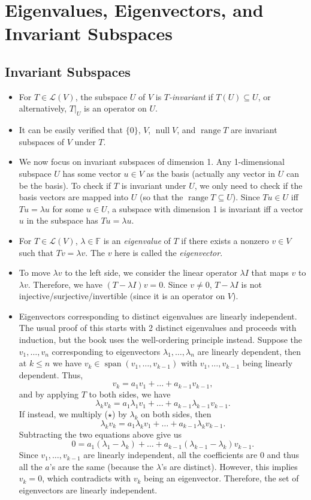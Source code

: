 \documentclass{article}
\newcommand{\F}{\mathbb{F}}
\newcommand{\s}{\operatorname{span}}
\newcommand{\n}{\operatorname{null}}
\renewcommand{\r}{\operatorname{range}}
\newcommand{\LV}{\mathcal{L}(V)}
\newcommand{\bv}{v_1,\dots,v_n}
\begin{document}
\section{Eigenvalues, Eigenvectors, and Invariant Subspaces}
\subsection{Invariant Subspaces}
\begin{itemize}
    \item For $T \in \LV$, the subspace $U$ of $V$ is \textit{$T$-invariant} if $T(U) \subseteq U$, or alternatively, $T|_U$ is an operator on $U$.
    \item It can be easily verified that $\{0\}$, $V$, $\n V$, and $\r T$ are invariant subspaces of $V$ under $T$.
    \item We now focus on invariant subspaces of dimension 1. Any 1-dimensional subspace $U$ has some vector $u \in V$ as the basis (actually any vector in $U$ can be the basis). To check if $T$ is invariant under $U$, we only need to check if the basis vectors are mapped into $U$ (so that the $\r T \subseteq U$). Since $Tu \in U$ iff $Tu = \lambda u$ for some $u \in U$, a subspace with dimension 1 is invariant iff a vector $u$ in the subspace has $Tu = \lambda u$.
    \item For $T \in \LV$, $\lambda \in \F$ is an \textit{eigenvalue} of $T$ if there exists a nonzero $v \in V$ such that $Tv = \lambda v$. The $v$ here is called the \textit{eigenvector}.
    \item To move $\lambda v$ to the left side, we consider the linear operator $\lambda I$ that maps $v$ to $\lambda v$. Therefore, we have $(T-\lambda I) v = 0$. Since $v \not= 0$, $T-\lambda I$ is not injective/surjective/invertible (since it is an operator on $V$).
    \item Eigenvectors corresponding to distinct eigenvalues are linearly independent. The usual proof of this starts with 2 distinct eigenvalues and proceeds with induction, but the book uses the well-ordering principle instead. Suppose the $\bv$ corresponding to eigenvectors $\lambda_1,\dots,\lambda_n$ are linearly dependent, then at $k \leq n$ we have $v_k \in \s(v_1,\dots,v_{k-1})$ with $v_1,\dots,v_{k-1}$ being linearly dependent. Thus, 
    \begin{equation}
        v_k = a_1 v_1 + \dots + a_{k-1}v_{k-1}, \tag{$\star$}
    \end{equation}
    and by applying $T$ to both sides, we have $$\lambda_k v_k = a_1 \lambda_1 v_1 + \dots + a_{k-1} \lambda_{k-1}v_{k-1}.$$ If instead, we multiply ($\star$) by $\lambda_k$ on both sides, then $$\lambda_k v_k = a_1 \lambda_k v_1 + \dots + a_{k-1} \lambda_k v_{k-1}.$$ Subtracting the two equations above give us $$0 = a_1 (\lambda_1 - \lambda_k) + \dots + a_{k-1} (\lambda_{k-1}-\lambda_k) v_{k-1}.$$ Since $v_1, \dots, v_{k-1}$ are linearly independent, all the coefficients are 0 and thus all the $a$'s are the same (because the $\lambda$'s are distinct). However, this implies $v_k = 0$, which contradicts with $v_k$ being an eigenvector. Therefore, the set of eigenvectors are linearly independent.

\end{itemize}
\end{document}
